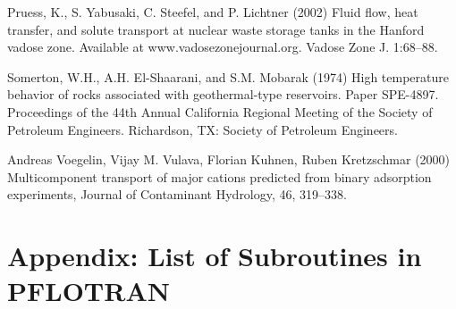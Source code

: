 \documentclass[12pt]{article}
\begin{document}
\begin{description}
\item Pruess, K., S. Yabusaki, C. Steefel, and P. Lichtner (2002) Fluid flow,
heat transfer, and solute transport at nuclear waste storage tanks in the Hanford vadose zone. Available at www.vadosezonejournal.org. Vadose Zone J. 1:68--88.

\item Somerton, W.H., A.H. El-Shaarani, and S.M. Mobarak (1974) 
High temperature behavior of rocks associated with geothermal-type reservoirs. Paper SPE-4897. Proceedings of the 44th Annual 
California Regional Meeting of the Society of Petroleum Engineers. Richardson, TX: Society of Petroleum Engineers. 

\item Andreas Voegelin, Vijay M. Vulava, Florian Kuhnen, Ruben Kretzschmar (2000) Multicomponent transport of major cations predicted from binary adsorption experiments, Journal of Contaminant Hydrology, 46, 319--338.
\end{description}


\newpage

\section{Appendix: List of Subroutines in PFLOTRAN}
\end{document}
